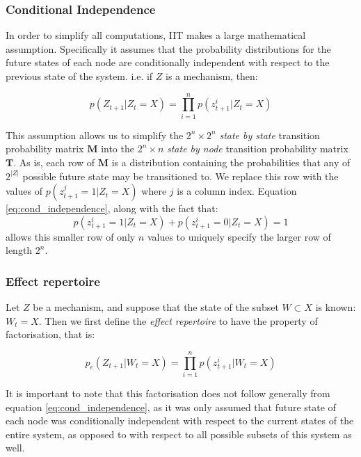 \subsubsection{Conditional Independence}
\label{sec:conditional_independence}
In order to simplify all computations, IIT makes a large mathematical assumption. Specifically it assumes that the probability distributions for the future states of each node are conditionally independent with respect to the previous state of the system. i.e. if $Z$ is a mechanism, then:

\begin{equation}
\label{eq:cond_independence}
p(Z_{t+1}|Z_t = X) = \prod \limits_{i=1}^{n} p(z^i_{t+1}|Z_t=X)
\end{equation}

This assumption allows us to simplify the $2^n \times 2^n $ \textit{state by state} transition probability matrix $\mathbf{M}$ into the $2^n \times n$ \textit{state by node} transition probability matrix $\mathbf{T}$. As is, each row of $\mathbf{M}$ is a distribution containing the probabilities that any of $2^{|Z|}$ possible future state may be transitioned to. We replace this row with the values of $p(z^j_{t+1}=1|Z_t=X)$ where $j$ is a column index. Equation \ref{eq:cond_independence}, along with the fact that: \[p(z^i_{t+1}=1|Z_t=X)+p(z^i_{t+1} =0|Z_t=X) =1\]
allows this smaller row of only $n$ values to uniquely specify the larger row of length $2^n$.


\subsubsection{Effect repertoire}

Let $Z$ be a mechanism, and suppose that the state of the subset $W \subset X$ is known: $W_t = X$. Then we first define the \textit{effect repertoire} to have the property of factorisation, that is:

\begin{equation}
\label{def:controversial}
p_e(Z_{t+1}|W_t = X) = \prod \limits_{i= 1}^n p(z^i_{t+1}|W_t = X)
\end{equation}

It is important to note that this factorisation does not follow generally from equation \ref{eq:cond_independence}, as it was only assumed that future state of each node was conditionally independent with respect to the current states of the entire system, as opposed to with respect to all possible subsets of this system as well.

